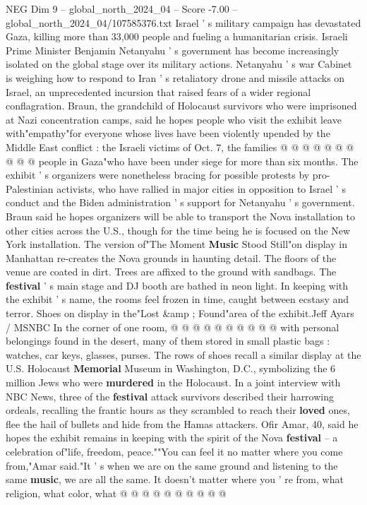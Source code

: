 \begin{textsample}{NEG Dim 9 – global\_north\_2024\_04 – Score -7.00 – global\_north\_2024\_04/107585376.txt}
Israel ' s military campaign has devastated Gaza, killing more than 33,000 people and fueling a humanitarian crisis.
Israeli Prime Minister Benjamin Netanyahu ' s government has become increasingly isolated on the global stage over its military actions.
Netanyahu ' s war Cabinet is weighing how to respond to Iran ' s retaliatory drone and missile attacks on Israel, an unprecedented incursion that raised fears of a wider regional conflagration.
Braun, the grandchild of Holocaust survivors who were imprisoned at Nazi concentration camps, said he hopes people who visit the exhibit leave with"empathy"for everyone whose lives have been violently upended by the Middle East conflict : the Israeli victims of Oct. 7, the families @ @ @ @ @ @ @ @ @ @ people in Gaza"who have been under siege for more than six months.
The exhibit ' s organizers were nonetheless bracing for possible protests by pro-Palestinian activists, who have rallied in major cities in opposition to Israel ' s conduct and the Biden administration ' s support for Netanyahu ' s government.
Braun said he hopes organizers will be able to transport the Nova installation to other cities across the U.S., though for the time being he is focused on the New York installation.
The version of"The Moment \textbf{Music} Stood Still"on display in Manhattan re-creates the Nova grounds in haunting detail.
The floors of the venue are coated in dirt.
Trees are affixed to the ground with sandbags.
The \textbf{festival} ' s main stage and DJ booth are bathed in neon light.
In keeping with the exhibit ' s name, the rooms feel frozen in time, caught between ecstasy and terror.
Shoes on display in the"Lost \&amp ; Found"area of the exhibit.Jeff Ayars / MSNBC In the corner of one room, @ @ @ @ @ @ @ @ @ @ with personal belongings found in the desert, many of them stored in small plastic bags : watches, car keys, glasses, purses.
The rows of shoes recall a similar display at the U.S.
Holocaust \textbf{Memorial} Museum in Washington, D.C., symbolizing the 6 million Jews who were \textbf{murdered} in the Holocaust.
In a joint interview with NBC News, three of the \textbf{festival} attack survivors described their harrowing ordeals, recalling the frantic hours as they scrambled to reach their \textbf{loved} ones, flee the hail of bullets and hide from the Hamas attackers.
Ofir Amar, 40, said he hopes the exhibit remains in keeping with the spirit of the Nova \textbf{festival} -- a celebration of"life, freedom, peace.""You can feel it no matter where you come from,"Amar said."It ' s when we are on the same ground and listening to the same \textbf{music}, we are all the same.
It doesn't matter where you ' re from, what religion, what color, what @ @ @ @ @ @ @ @ @ @

\end{textsample}
